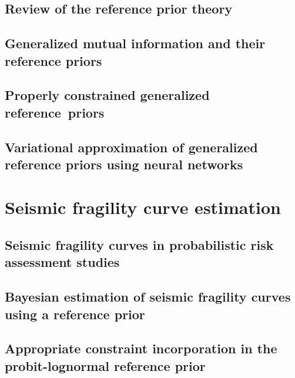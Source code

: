 \documentclass[a4paper]{book}
\begin{document}
\chapter{Review of the reference prior theory}\label{chap:intro-ref}




\chapter{Generalized mutual information and their reference priors}\label{chap:ref-generalized}




\chapter{Properly constrained generalized reference~priors}\label{chap:constrained-prior}




\chapter{Variational approximation of generalized reference priors using neural networks}\label{chap:varp}




\part{Seismic fragility curve estimation}\label{part:spra}


\chapter{Seismic fragility curves in probabilistic risk assessment studies}\label{chap:frags-intro}




\chapter{Bayesian estimation of seismic fragility curves using a reference prior}\label{chap:prem}




\chapter{Appropriate constraint incorporation in the probit-lognormal reference prior%
}\label{chap:constrained-frags}
\end{document}
